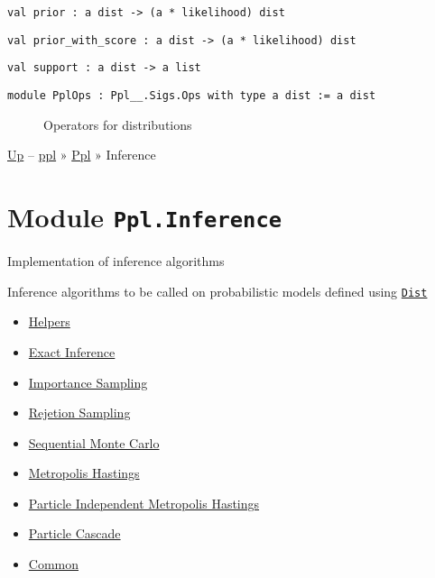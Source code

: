 \protect\hyperlink{val-prior}{}\texttt{val\ prior\ :\ \textquotesingle{}a\ dist\ -\textgreater{}\ (\textquotesingle{}a\ *\ likelihood)\ dist}

\protect\hyperlink{val-priorux5fwithux5fscore}{}\texttt{val\ prior\_with\_score\ :\ \textquotesingle{}a\ dist\ -\textgreater{}\ (\textquotesingle{}a\ *\ likelihood)\ dist}

\protect\hyperlink{val-support}{}\texttt{val\ support\ :\ \textquotesingle{}a\ dist\ -\textgreater{}\ \textquotesingle{}a\ list}

\begin{description}
\item[{\protect\hyperlink{module-PplOps}{}\texttt{module\ PplOps\ :\ Ppl\_\_.Sigs.Ops\ with\ type\ \textquotesingle{}a\ dist\ :=\ \textquotesingle{}a\ dist}}]
Operators for distributions
\end{description}

\href{../index.html}{Up} -- \href{../../index.html}{ppl} »
\href{../index.html}{Ppl} » Inference

\section{\texorpdfstring{Module
\texttt{Ppl.Inference}}{Module Ppl.Inference}}\label{module-ppl.inference}

Implementation of inference algorithms

Inference algorithms to be called on probabilistic models defined using
\href{../Dist/index.html}{\texttt{Dist}}

\begin{itemize}
\tightlist
\item
  \protect\hyperlink{infux5fhelpers}{Helpers}
\item
  \protect\hyperlink{infux5fexact}{Exact Inference}
\item
  \protect\hyperlink{infux5fimp}{Importance Sampling}
\item
  \protect\hyperlink{rejux5fhelpers}{Rejetion Sampling}
\item
  \protect\hyperlink{infux5fsmc}{Sequential Monte Carlo}
\item
  \protect\hyperlink{infux5fmh}{Metropolis Hastings}
\item
  \protect\hyperlink{infux5fpmcmc}{Particle Independent Metropolis
  Hastings}
\item
  \protect\hyperlink{infux5fpc}{Particle Cascade}
\item
  \protect\hyperlink{com}{Common}
\end{itemize}

